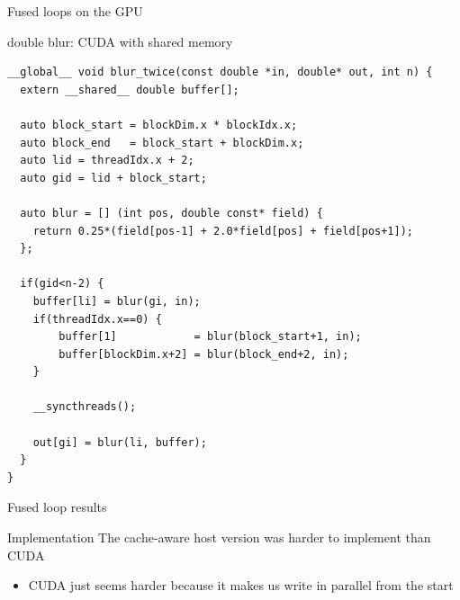 \begin{frame}[fragile]{Fused loops on the GPU}
    \begin{code}{double blur: CUDA with shared memory}
        \begin{lstlisting}[style=boxcudatiny]
__global__ void blur_twice(const double *in, double* out, int n) {
  extern __shared__ double buffer[];

  auto block_start = blockDim.x * blockIdx.x;
  auto block_end   = block_start + blockDim.x;
  auto lid = threadIdx.x + 2;
  auto gid = lid + block_start;

  auto blur = [] (int pos, double const* field) {
    return 0.25*(field[pos-1] + 2.0*field[pos] + field[pos+1]);
  };

  if(gid<n-2) {
    buffer[li] = blur(gi, in);
    if(threadIdx.x==0) {
        buffer[1]            = blur(block_start+1, in);
        buffer[blockDim.x+2] = blur(block_end+2, in);
    }

    __syncthreads();

    out[gi] = blur(li, buffer);
  }
}
        \end{lstlisting}
    \end{code}
\end{frame}

\begin{frame}[fragile]{Fused loop results}
    \begin{info}{Implementation}
        The cache-aware host version was harder to implement than CUDA
        \begin{itemize}
            \item CUDA just seems harder because it makes us write in parallel from the start
        \end{itemize}
    \end{info}

\end{frame}

